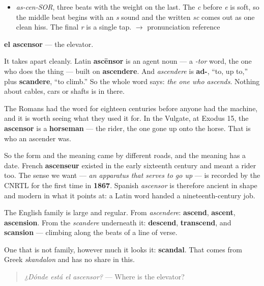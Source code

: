 \begin{sounds}
\begin{itemize}
\raggedright
  \item \emph{as-cen-SOR}, three beats with the weight on the last. The \emph{c} before \emph{e} is soft, so the middle beat begins with an \emph{s} sound and the written \emph{sc} comes out as one clean hiss. The final \emph{r} is a single tap. $\to$ pronunciation reference
\end{itemize}
\end{sounds}

\begin{cousinweb}
\textbf{el ascensor} — the elevator.

It takes apart cleanly. Latin \textbf{ascēnsor} is an agent noun — a \emph{-tor} word, the one who does the thing — built on \textbf{ascendere}. And \emph{ascendere} is \textbf{ad-}, \textquotedblleft{}to, up to,\textquotedblright{} plus \textbf{scandere}, \textquotedblleft{}to climb.\textquotedblright{} So the whole word says: \emph{the one who ascends}. Nothing about cables, cars or shafts is in there.

The Romans had the word for eighteen centuries before anyone had the machine, and it is worth seeing what they used it for. In the Vulgate, at Exodus 15, the \textbf{ascensor} is a \textbf{horseman} — the rider, the one gone up onto the horse. That is who an ascender was.

So the form and the meaning came by different roads, and the meaning has a date. French \textbf{ascenseur} existed in the early sixteenth century and meant a rider too. The sense we want — \emph{an apparatus that serves to go up} — is recorded by the CNRTL for the first time in \textbf{1867}. Spanish \emph{ascensor} is therefore ancient in shape and modern in what it points at: a Latin word handed a nineteenth-century job.

The English family is large and regular. From \emph{ascendere}: \textbf{ascend}, \textbf{ascent}, \textbf{ascension}. From the \emph{scandere} underneath it: \textbf{descend}, \textbf{transcend}, and \textbf{scansion} — climbing along the beats of a line of verse.

One that is not family, however much it looks it: \textbf{scandal}. That comes from Greek \emph{skandalon} and has no share in this.

\begin{quote}
\emph{¿Dónde está el ascensor?} — Where is the elevator?
\end{quote}
\end{cousinweb}

